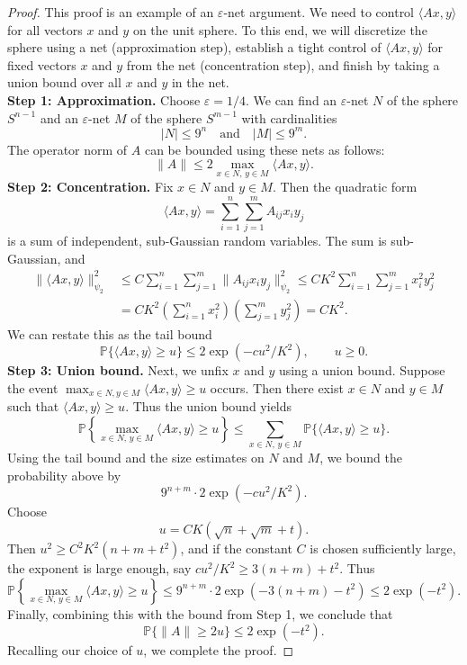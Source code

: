\begin{proof}
This proof is an example of an $\varepsilon$-net argument. We need to control $\langle Ax, y \rangle$ for all vectors $x$ and $y$ on the unit sphere. To this end, we will discretize the sphere using a net (approximation step), establish a tight control of $\langle Ax, y \rangle$ for fixed vectors $x$ and $y$ from the net (concentration step), and finish by taking a union bound over all $x$ and $y$ in the net.
\\\textbf{Step 1: Approximation.} Choose $\varepsilon = 1/4$. We can find an $\varepsilon$-net $N$ of the sphere $S^{n-1}$ and an $\varepsilon$-net $M$ of the sphere $S^{m-1}$ with cardinalities
\[
|N| \leq 9^n \quad \text{and} \quad |M| \leq 9^m.
\]
The operator norm of $A$ can be bounded using these nets as follows:
\[
\|A\| \leq 2 \max_{x \in N, \, y \in M} \langle Ax, y \rangle.
\]
\textbf{Step 2: Concentration.} Fix $x \in N$ and $y \in M$. Then the quadratic form
\[
\langle Ax, y \rangle = \sum_{i=1}^n \sum_{j=1}^m A_{ij} x_i y_j
\]
is a sum of independent, sub-Gaussian random variables. The sum is sub-Gaussian, and
\begin{align*}
\|\langle Ax, y \rangle\|_{\psi_2}^2 
&\leq C \sum_{i=1}^n \sum_{j=1}^m \|A_{ij} x_i y_j\|_{\psi_2}^2 
\leq C K^2 \sum_{i=1}^n \sum_{j=1}^m x_i^2 y_j^2 \\
&= C K^2 \!\left( \sum_{i=1}^n x_i^2 \right) \!\left( \sum_{j=1}^m y_j^2 \right) 
= C K^2.
\end{align*}
We can restate this as the tail bound
\[
\mathbb{P}\{\langle Ax, y \rangle \geq u\} \leq 2 \exp(-c u^2 / K^2), \qquad u \geq 0.
\]
\textbf{Step 3: Union bound.} Next, we unfix $x$ and $y$ using a union bound. Suppose the event $\max_{x \in N, y \in M} \langle Ax, y \rangle \geq u$ occurs. Then there exist $x \in N$ and $y \in M$ such that $\langle Ax, y \rangle \geq u$. Thus the union bound yields
\[
\mathbb{P}\!\left\{ \max_{x \in N, \, y \in M} \langle Ax, y \rangle \geq u \right\} \leq \sum_{x \in N, \, y \in M} \mathbb{P}\{\langle Ax, y \rangle \geq u\}.
\]
Using the tail bound and the size estimates on $N$ and $M$, we bound the probability above by
\[
9^{n + m} \cdot 2 \exp(-c u^2 / K^2).
\]
Choose
\[
u = C K (\sqrt{n} + \sqrt{m} + t).
\]
Then $u^2 \geq C^2 K^2 (n + m + t^2)$, and if the constant $C$ is chosen sufficiently large, the exponent is large enough, say $c u^2 / K^2 \geq 3(n + m) + t^2$. Thus
\[
\mathbb{P}\!\left\{ \max_{x \in N, \, y \in M} \langle Ax, y \rangle \geq u \right\} \leq 9^{n+m} \cdot 2 \exp(-3(n+m) - t^2) \leq 2 \exp(-t^2).
\]
Finally, combining this with the bound from Step 1, we conclude that
\[
\mathbb{P}\{\|A\| \geq 2u\} \leq 2 \exp(-t^2).
\]
Recalling our choice of $u$, we complete the proof.
\end{proof}

